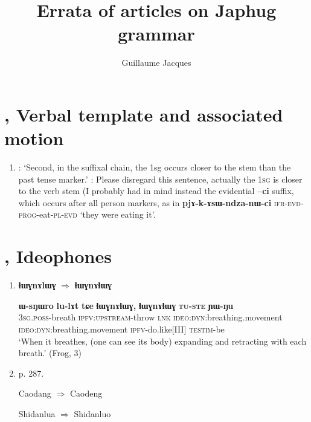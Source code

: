 \documentclass[oldfontcommands,oneside,a4paper,11pt]{article}
\newcommand{\ipa}[1]{{\phon\textbf{\mbox{#1}}}}
\begin{document}
 
\title{Errata of articles on Japhug grammar}
\author{Guillaume Jacques}
\maketitle

\section{\citet{jacques13harmonization}, Verbal template and associated motion}
\begin{enumerate}
\item \citet[199]{jacques13harmonization}: `Second, in the suffixal chain, the 1sg occurs closer to the stem than the past tense marker.' : Please disregard this sentence, actually the \textsc{1sg} is closer to the verb stem (I probably had in mind instead the evidential \ipa{--ci} suffix, which occurs after all person markers, as in \ipa{pjɤ-k-ɤsɯ-ndza-nɯ-ci} \textsc{ifr-evd-prog}-eat-\textsc{pl-evd} `they were eating it'. 

\end{enumerate}

\section{\citet{japhug14ideophones}, Ideophones}
\begin{enumerate}
\item \citet[273, ex. 27]{japhug14ideophones} \ipa{ɬɯɣnɤlɯɣ} $\Rightarrow$ \ipa{ɬɯɣnɤɬɯɣ}
\begin{exe}
\ex \label{ex:lhWG.nA.lhWG}
\gll
\ipa{ɯ-sŋɯro} 	\ipa{lu-lɤt} 	\ipa{tɕe} 	\ipa{ɬɯɣnɤɬɯɣ,} 	\ipa{\textbf{ɬɯɣnɤɬɯɣ}} 	\textsc{\ipa{tu-ste}} 	\ipa{ɲɯ-ŋu} \\
\textsc{3sg.poss}-breath \textsc{ipfv:upstream}-throw \textsc{lnk} \textsc{ideo:dyn}:breathing.movement \textsc{ideo:dyn}:breathing.movement \textsc{ipfv}-do.like[III] \textsc{testim}-be \\
\glt `When it breathes, (one can see its body) expanding and retracting with each breath.' (Frog, 3)
\end{exe}

\item p. 287. 

Caodang   $\Rightarrow$ Caodeng


Shidanlua   $\Rightarrow$ Shidanluo
\end{enumerate}
\end{document}
